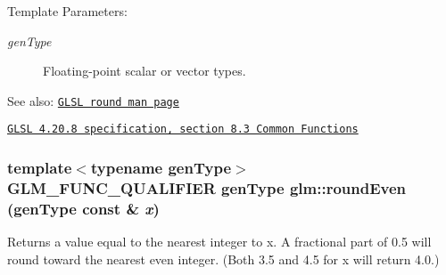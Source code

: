 \begin{Desc}
\item[Template Parameters:]
\begin{description}
\item[{\em genType}]Floating-point scalar or vector types.\end{description}
\end{Desc}
\begin{Desc}
\item[See also:]\href{http://www.opengl.org/sdk/docs/manglsl/xhtml/round.xml}{\tt GLSL round man page} 

\href{http://www.opengl.org/registry/doc/GLSLangSpec.4.20.8.pdf}{\tt GLSL 4.20.8 specification, section 8.3 Common Functions} \end{Desc}
\hypertarget{group__core__func__common_ge07e5945cc0443ab91a28da0aa2ba864}{
\subsubsection[roundEven]{\setlength{\rightskip}{0pt plus 5cm}template$<$typename genType$>$ GLM\_\-FUNC\_\-QUALIFIER genType glm::roundEven (genType const \& {\em x})}}
\label{group__core__func__common_ge07e5945cc0443ab91a28da0aa2ba864}


Returns a value equal to the nearest integer to x. A fractional part of 0.5 will round toward the nearest even integer. (Both 3.5 and 4.5 for x will return 4.0.)

